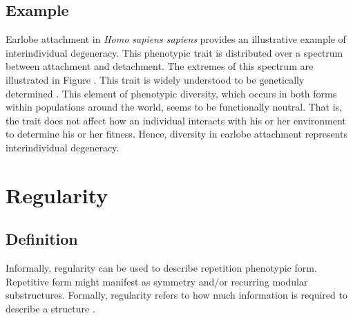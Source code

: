 \subsection{Example}
Earlobe attachment in \textit{Homo sapiens sapiens} provides an illustrative example of interindividual degeneracy. This phenotypic trait is distributed over a spectrum between attachment and detachment. The extremes of this spectrum are illustrated in Figure . This trait is widely understood to be genetically determined \cite{Dutta1979EarlobeAssam}. This element of phenotypic diversity, which occurs in both forms within populations around the world, seems to be functionally neutral. That is, the trait does not affect how an individual interacts with his or her environment to determine his or her fitness. Hence, diversity in earlobe attachment represents interindividual degeneracy.


\section{Regularity} \label{sec:regularity}
\subsection{Definition}
Informally, regularity can be used to describe repetition phenotypic form. Repetitive form might manifest as symmetry and/or recurring  modular substructures. Formally, regularity refers to how much information is required to describe a structure \cite{Clune2011OnRegularity}.

